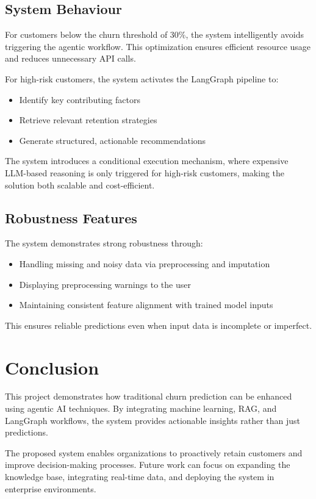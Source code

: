 \documentclass[conference]{IEEEtran}
\begin{document}
\subsection{System Behaviour}

For customers below the churn threshold of 30\%, the system intelligently avoids triggering the agentic workflow. This optimization ensures efficient resource usage and reduces unnecessary API calls.

For high-risk customers, the system activates the LangGraph pipeline to:
\begin{itemize}[leftmargin=*]
\item Identify key contributing factors
\item Retrieve relevant retention strategies
\item Generate structured, actionable recommendations
\end{itemize}

The system introduces a conditional execution mechanism, where expensive LLM-based reasoning is only triggered for high-risk customers, making the solution both scalable and cost-efficient.

\subsection{Robustness Features}

The system demonstrates strong robustness through:
\begin{itemize}[leftmargin=*]
\item Handling missing and noisy data via preprocessing and imputation
\item Displaying preprocessing warnings to the user
\item Maintaining consistent feature alignment with trained model inputs
\end{itemize}

This ensures reliable predictions even when input data is incomplete or imperfect.

\section{Conclusion}

This project demonstrates how traditional churn prediction can be enhanced using agentic AI techniques. By integrating machine learning, RAG, and LangGraph workflows, the system provides actionable insights rather than just predictions.

The proposed system enables organizations to proactively retain customers and improve decision-making processes. Future work can focus on expanding the knowledge base, integrating real-time data, and deploying the system in enterprise environments.
\end{document}
